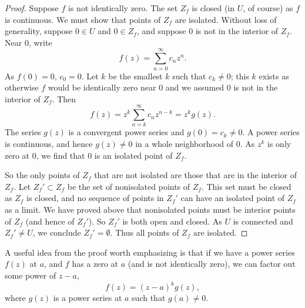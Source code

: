 \documentclass[12pt,openany]{book}
\theoremstyle{plain}
\theoremstyle{remark}
\theoremstyle{definition}
\theoremstyle{exercise}
\theoremstyle{example}
\begin{document}
\begin{proof}
Suppose $f$ is not identically zero.
The set $Z_f$ is closed (in $U$, of course) as $f$ is continuous.  We must show
that points of $Z_f$ are isolated.
Without loss of generality, suppose $0 \in U$ and $0 \in Z_f$,
and suppose $0$ is not in the interior of $Z_f$.
Near $0$, write
\begin{equation*}
f(z) = \sum_{n=0}^\infty c_n z^n .
\end{equation*}
As $f(0) = 0$, $c_0 =0$.  Let $k$ be the smallest $k$ such that $c_k \neq 0$;
this $k$ exists as otherwise $f$ would be identically zero near $0$
and we assumed $0$ is not in the interior of $Z_f$.  Then
\begin{equation*}
f(z) = z^k \sum_{n=k}^\infty c_n z^{n-k} = z^k g(z) .
\end{equation*}
The series $g(z)$ is a convergent power series and
$g(0) = c_k \neq 0$.
A power series is continuous, and hence $g(z) \neq 0$ in a whole
neighborhood of $0$.
As $z^k$ is only zero at $0$, we find that $0$ is an isolated point of $Z_f$.

So the only points of $Z_f$ that are not isolated are those that are in the
interior of $Z_f$.  Let $Z_f' \subset Z_f$ be the set of nonisolated points
of $Z_f$.  This set must be closed as $Z_f$ is closed, and no sequence
of points in $Z_f'$ can
have an isolated point of $Z_f$ as a limit.
We have proved above that nonisolated
points must be interior points of $Z_f$ (and hence of $Z_f'$).
So $Z_f'$ is both open and closed.  As $U$ is connected and 
$Z_f' \neq U$, we conclude $Z_f' = \emptyset$.
Thus all points of $Z_f$ are isolated.
\end{proof}

A useful idea from the proof worth emphasizing
is that if we have a power series $f(z)$ at $a$,
and $f$ has a zero at $a$ (and is not identically zero),
we can factor out some power of $z-a$,
\begin{equation*}
f(z) = {(z-a)}^k g(z) ,
\end{equation*}
where $g(z)$ is a power series at $a$ such that $g(a) \neq 0$.
\end{document}
